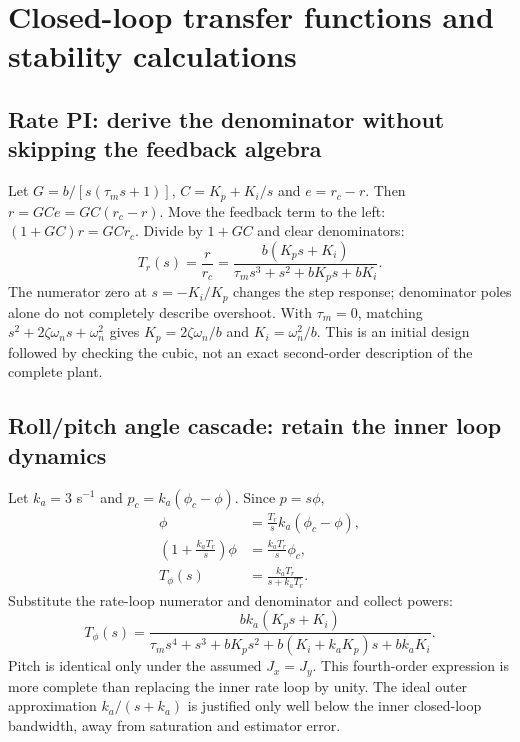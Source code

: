 \chapter{Closed-loop transfer functions and stability calculations}
\section{Rate PI: derive the denominator without skipping the feedback algebra}
Let $G=b/[s(\tau_ms+1)]$, $C=K_p+K_i/s$ and $e=r_c-r$.
Then $r=GCe=GC(r_c-r)$. Move the feedback term to the left:
$(1+GC)r=GC r_c$. Divide by $1+GC$ and clear denominators:
\begin{equation}
T_r(s)=\frac{r}{r_c}=
\frac{b(K_ps+K_i)}{\tau_ms^3+s^2+bK_ps+bK_i}.
\end{equation}
The numerator zero at $s=-K_i/K_p$ changes the step response; denominator
poles alone do not completely describe overshoot. With $\tau_m=0$, matching
$s^2+2\zeta\omega_ns+\omega_n^2$ gives $K_p=2\zeta\omega_n/b$ and
$K_i=\omega_n^2/b$. This is an initial design followed by checking the cubic,
not an exact second-order description of the complete plant.

\section{Roll/pitch angle cascade: retain the inner loop dynamics}
Let $k_a=3$ s$^{-1}$ and $p_c=k_a(\phi_c-\phi)$. Since $p=s\phi$,
\begin{align}
\phi&=\frac{T_r}{s}k_a(\phi_c-\phi),\\
\left(1+\frac{k_aT_r}{s}\right)\phi&=\frac{k_aT_r}{s}\phi_c,\\
T_\phi(s)&=\frac{k_aT_r}{s+k_aT_r}.
\end{align}
Substitute the rate-loop numerator and denominator and collect powers:
\begin{equation}
\boxed{T_\phi(s)=\frac{bk_a(K_ps+K_i)}{
\tau_ms^4+s^3+bK_ps^2+b(K_i+k_aK_p)s+bk_aK_i}.}
\end{equation}
Pitch is identical only under the assumed $J_x=J_y$. This fourth-order
expression is more complete than replacing the inner rate loop by unity.
The ideal outer approximation $k_a/(s+k_a)$ is justified only well below the
inner closed-loop bandwidth, away from saturation and estimator error.

